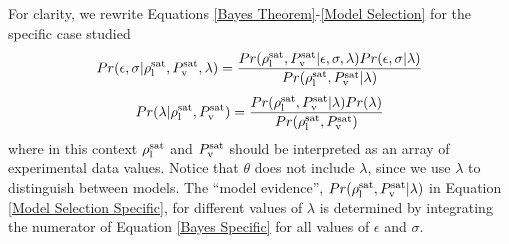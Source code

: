 \documentclass[journal=jctc,manuscript=article]{achemso}
\begin{document}
For clarity, we rewrite Equations \ref{Bayes Theorem}-\ref{Model Selection} for the specific case studied
\begin{equation} \label{Bayes Specific}
Pr(\epsilon,\sigma|\rho_{\rm l}^{\rm sat},P_{\rm v}^{\rm sat},\lambda) = \frac{Pr(\rho_{\rm l}^{\rm sat},P_{\rm v}^{\rm sat}|\epsilon,\sigma,\lambda)Pr(\epsilon,\sigma|\lambda)}{Pr(\rho_{\rm l}^{\rm sat},P_{\rm v}^{\rm sat}|\lambda)}
\end{equation}
\begin{equation} \label{Model Selection Specific}
Pr(\lambda|\rho_{\rm l}^{\rm sat},P_{\rm v}^{\rm sat}) = \frac{Pr(\rho_{\rm l}^{\rm sat},P_{\rm v}^{\rm sat}|\lambda)Pr(\lambda)}{Pr(\rho_{\rm l}^{\rm sat},P_{\rm v}^{\rm sat})}
\end{equation}
where in this context $\rho_{\rm l}^{\rm sat}$ and $P_{\rm v}^{\rm sat}$ should be interpreted as an array of experimental data values. Notice that $\theta$ does not include $\lambda$, since we use $\lambda$ to distinguish between models. The ``model evidence'', $Pr(\rho_{\rm l}^{\rm sat},P_{\rm v}^{\rm sat}|\lambda)$ in Equation \ref{Model Selection Specific}, for different values of $\lambda$ is determined by integrating the numerator of Equation \ref{Bayes Specific} for all values of $\epsilon$ and $\sigma$. 


%
\end{document}
